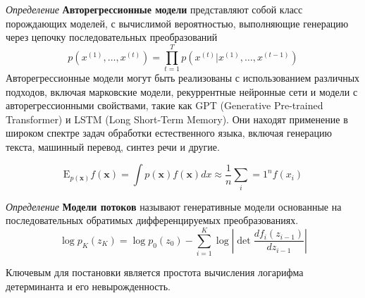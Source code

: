 \textit{Определение } \textbf{Авторегрессионные модели} представляют собой класс порождающих моделей,
с вычислимой  вероятностью, выполняющие генерацию через цепочку последовательных преобразований \begin{equation}
    p(x^{(1)},\dots,x^{(t)}) = \prod_{t=1}^T p(x^{(t)}|x^{(1)},\dots,x^{(t-1)})
\end{equation}
Авторегрессионные модели могут быть реализованы с использованием различных подходов, 
включая марковские модели, рекуррентные нейронные сети и модели с авторегрессионными свойствами, такие как GPT (Generative Pre-trained Transformer) и LSTM (Long Short-Term Memory). 
Они находят применение в широком спектре задач обработки естественного языка, включая генерацию текста, машинный перевод, синтез речи и другие.

\begin{equation}
    \mathrm E_{p(\mathbf{x})} f(\mathbf{x}) = \int p(\mathbf{x}) f(\mathbf{x}) dx \approx \frac{1}{n} \sum_i=1^n f(x_i)
\end{equation}

\textit{Определение } \textbf{Модели потоков} называют генеративные модели основанные 
на последовательных обратимых дифференцируемых преобразованиях.
\begin{equation}
    \log p_{K}(z_K) = \log p_0(z_0) - \sum_{i=1}^K \log \left|\det \frac{d f_i(z_{i-1})}{d z_{i-1}} \right| 
\end{equation}

Ключевым для постановки является простота вычисления логарифма детерминанта и его невырожденность.